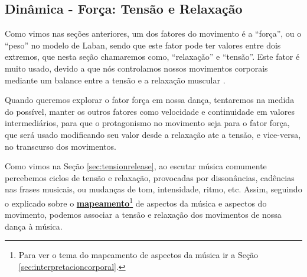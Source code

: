 \subsection{Dinâmica - Força: Tensão e Relaxação }
\label{sec:musicalidadetensionrelease}



Como vimos nas seções anteriores,
um dos fatores do movimento é a ``força'', 
ou o ``peso'' no modelo de Laban,
sendo que este fator pode ter valores entre dois extremos,
que nesta seção chamaremos como, ``relaxação'' e ``tensão''.
Este fator é muito usado, 
devido a que nós controlamos nossos movimentos corporais 
mediante um balance entre a tensão e a relaxação muscular \cite[pp. 7]{schrader2005sense}.

Quando queremos explorar o fator força em nossa dança, tentaremos na medida do possível,
manter os outros fatores como velocidade e continuidade em valores intermediários,
para que o protagonismo no movimento seja para o fator força,
que será usado modificando seu valor desde a relaxação ate a tensão, e vice-versa, no transcurso dos movimentos. 

Como vimos na Seção \ref{sec:tensionrelease}, 
ao escutar música comumente percebemos ciclos de tensão e relaxação,
provocadas por dissonâncias,  cadências nas frases musicais, ou mudanças de
tom, intensidade, ritmo, etc.
Assim, 
seguindo o explicado sobre o \hyperref[sec:interpretacioncorporal]{\textbf{mapeamento}}\footnote{Para
ver o tema do mapeamento de aspectos da música ir a Seção \ref{sec:interpretacioncorporal}.} 
de aspectos da música e aspectos do movimento,
podemos associar a tensão e relaxação dos movimentos de nossa dança à música.



